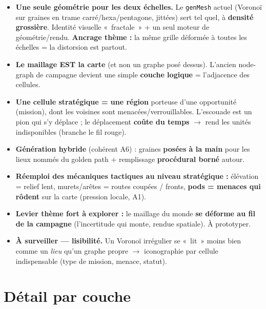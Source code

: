\documentclass[11pt,a4paper]{article}
\begin{document}
\begin{itemize}
\item \textbf{Une seule géométrie pour les deux échelles.} Le \texttt{genMesh} actuel (Voronoï sur graines en trame carré/hexa/pentagone, jittées) sert tel quel, à \textbf{densité grossière}. Identité visuelle «~fractale~» + un seul moteur de géométrie/rendu. \textbf{Ancrage thème :} la même grille déformée à toutes les échelles = la distorsion est partout.
\item \textbf{Le maillage EST la carte} (et non un graphe posé dessus). L'ancien node-graph de campagne devient une simple \textbf{couche logique} = l'adjacence des cellules.
\item \textbf{Une cellule stratégique = une région} porteuse d'une opportunité (mission), dont les voisines sont menacées/verrouillables. L'escouade est un pion qui s'y déplace ; le déplacement \textbf{coûte du temps} $\rightarrow$ rend les unités indisponibles (branche le fil rouge).
\item \textbf{Génération hybride} (cohérent A6) : graines \textbf{posées à la main} pour les lieux nommés du golden path + remplissage \textbf{procédural borné} autour.
\item \textbf{Réemploi des mécaniques tactiques au niveau stratégique :} élévation = relief lent, murets/arêtes = routes coupées / fronts, \textbf{pods = menaces qui rôdent} sur la carte (pression locale, A1).
\item \textbf{Levier thème fort à explorer :} le maillage du monde \textbf{se déforme au fil de la campagne} (l'incertitude qui monte, rendue spatiale). À prototyper.
\item \textbf{À surveiller --- lisibilité.} Un Voronoï irrégulier se «~lit~» moins bien comme un \emph{lieu} qu'un graphe propre $\rightarrow$ iconographie par cellule indispensable (type de mission, menace, statut).
\end{itemize}

\section{Détail par couche}
\end{document}
